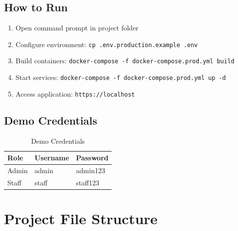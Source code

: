 \documentclass[12pt,a4paper]{article}
\begin{document}
\subsection{How to Run}

\begin{enumerate}
    \item Open command prompt in project folder
    \item Configure environment: \texttt{cp .env.production.example .env}
    \item Build containers: \texttt{docker-compose -f docker-compose.prod.yml build}
    \item Start services: \texttt{docker-compose -f docker-compose.prod.yml up -d}
    \item Access application: \texttt{https://localhost}
\end{enumerate}

\subsection{Demo Credentials}

\begin{table}[H]
\centering
\begin{tabular}{|l|l|l|}
\hline
\textbf{Role} & \textbf{Username} & \textbf{Password} \\
\hline
Admin & admin & admin123 \\
\hline
Staff & staff & staff123 \\
\hline
\end{tabular}
\caption{Demo Credentials}
\end{table}

\section{Project File Structure}
\end{document}
